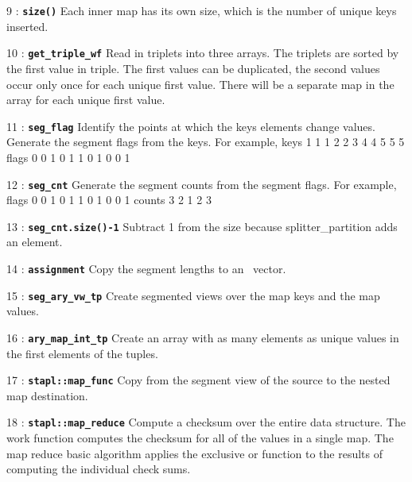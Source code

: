 \documentclass{report}
\begin{document}
\begin{hashitemize}
\item 9 : \texttt{{\bf size()}}
\newline
Each inner map has its own size, which is the number of unique keys inserted.

\item 10 : \texttt{{\bf get\_triple\_wf}}
\newline
Read in triplets into three arrays.
The triplets are sorted by the first value in triple.
The first values can be duplicated, the second values occur
only once for each unique first value.
There will be a separate map in the array for each unique first value.

\item 11 : \texttt{{\bf seg\_flag}}
\newline
Identify the points at which the keys elements change values.
Generate the segment flags from the keys.  For example,
\newline
keys   1 1 1 2 2 3 4 4 5 5 5
\newline
flags  0 0 1 0 1 1 0 1 0 0 1

\item 12 : \texttt{{\bf seg\_cnt}}
\newline
Generate the segment counts from the segment flags.  For example,
\newline
flags   0 0 1 0 1 1 0 1 0 0 1
\newline
counts  3 2 1 2 3

\item 13 : \texttt{{\bf seg\_cnt.size()-1}}
\newline
Subtract 1 from the size because splitter\_partition adds an element.

\item 14 : \texttt{{\bf assignment}}
\newline
Copy the segment lengths to an \stl\ vector.

\item 15 : \texttt{{\bf seg\_ary\_vw\_tp}}
\newline
Create segmented views over the map keys and the map values.

\item 16 : \texttt{{\bf ary\_map\_int\_tp}}
\newline
Create an array with as many elements as unique values in the
first elements of the tuples.

\item 17 : \texttt{{\bf stapl::map\_func}}
\newline
Copy from the segment view of the source to the nested map destination.

\item 18 : \texttt{{\bf stapl::map\_reduce}}
\newline
Compute a checksum over the entire data structure.  The work function computes
the checksum for all of the values in a single map.  The map reduce basic
algorithm applies the exclusive or function to the results of computing
the individual check sums.

\end{hashitemize}
\end{document}
